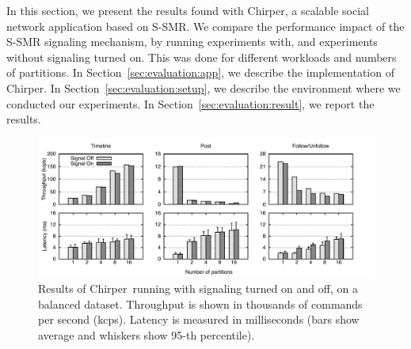 \documentclass[11pt]{article}
\newcommand{\ssmr}{\mbox{S-SMR}}
\newcommand{\appname}{Chirper} %
\begin{document}
In this section, we present the results found with \appname{}, a scalable social network application based on \ssmr{}.
We compare the performance impact of the \ssmr{} signaling mechanism, by running experiments with, and experiments without signaling turned on.
This was done for different workloads and numbers of partitions.
In Section~\ref{sec:evaluation:app}, we describe the implementation of \appname{}.
In Section~\ref{sec:evaluation:setup}, we describe the environment where we conducted our experiments.
In Section~\ref{sec:evaluation:result}, we report the results.

\begin{figure}
\begin{minipage}[b]{1\linewidth} %
\centering
      \includegraphics[width=1\linewidth]{figures/sc-at-scale-balance}
%
\end{minipage}
\caption{Results of \appname\ running with signaling turned on and off, on a balanced dataset. Throughput is shown in thousands of commands per second (kcps). Latency is measured in milliseconds (bars show average and whiskers show 95-th percentile).}
\label{fig:perf}
\end{figure}
\end{document}
